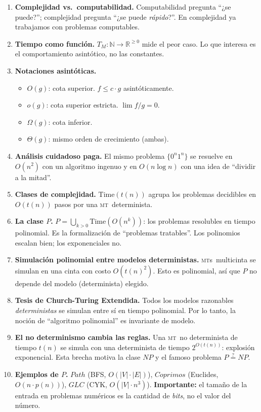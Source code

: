 \documentclass[11pt,a4paper]{article}
\theoremstyle{definicion}
\newcommand{\MT}{\textsc{mt}}
\newcommand{\MTs}{\textsc{mt}s}
\newcommand{\N}{\mathbb{N}}
\newcommand{\R}{\mathbb{R}}
\begin{document}
\begin{enumerate}
    \item \textbf{Complejidad vs.\ computabilidad.} Computabilidad pregunta ``¿se puede?''; complejidad pregunta ``¿se puede \emph{rápido}?''. En complejidad ya trabajamos con problemas computables.

    \item \textbf{Tiempo como función.} $T_M : \N \to \R^{\geq 0}$ mide el peor caso. Lo que interesa es el comportamiento asintótico, no las constantes.

    \item \textbf{Notaciones asintóticas.}
    \begin{itemize}
        \item $O(g)$: cota superior. $f \leq c \cdot g$ asintóticamente.
        \item $o(g)$: cota superior estricta. $\lim f/g = 0$.
        \item $\Omega(g)$: cota inferior.
        \item $\Theta(g)$: mismo orden de crecimiento (ambas).
    \end{itemize}

    \item \textbf{Análisis cuidadoso paga.} El mismo problema $\{0^n 1^n\}$ se resuelve en $O(n^2)$ con un algoritmo ingenuo y en $O(n \log n)$ con una idea de ``dividir a la mitad''.

    \item \textbf{Clases de complejidad.} $\mathrm{Time}(t(n))$ agrupa los problemas decidibles en $O(t(n))$ pasos por una \MT\ determinista.

    \item \textbf{La clase $P$.} $P = \bigcup_{k > 0} \mathrm{Time}(O(n^k))$: los problemas resolubles en tiempo polinomial. Es la formalización de ``problemas tratables''. Los polinomios escalan bien; los exponenciales no.

    \item \textbf{Simulación polinomial entre modelos deterministas.} \MTs\ multicinta se simulan en una cinta con costo $O(t(n)^2)$. Esto es polinomial, así que $P$ no depende del modelo (determinista) elegido.

    \item \textbf{Tesis de Church-Turing Extendida.} Todos los modelos razonables \emph{deterministas} se simulan entre sí en tiempo polinomial. Por lo tanto, la noción de ``algoritmo polinomial'' es invariante de modelo.

    \item \textbf{El no determinismo cambia las reglas.} Una \MT\ no determinista de tiempo $t(n)$ se simula con una determinista de tiempo $2^{O(t(n))}$: explosión exponencial. Esta brecha motiva la clase $NP$ y el famoso problema $P \stackrel{?}{=} NP$.

    \item \textbf{Ejemplos de $P$.} $\mathit{Path}$ (BFS, $O(|V| \cdot |E|)$), $\mathit{Coprimos}$ (Euclides, $O(n \cdot p(n))$), $\mathit{GLC}$ (CYK, $O(|V| \cdot n^3)$). \textbf{Importante:} el tamaño de la entrada en problemas numéricos es la cantidad de \emph{bits}, no el valor del número.
\end{enumerate}
\end{document}
